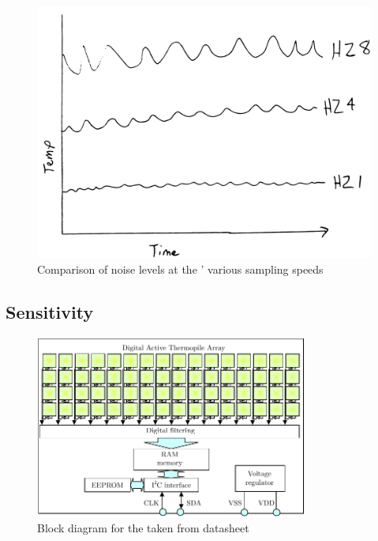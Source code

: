 \documentclass[../thesis/thesis.tex]{subfiles}
\begin{document}
\begin{figure}
\centering
\includegraphics[width=\linewidth]{../diagrams/temp/noise.pdf}
\caption{Comparison of noise levels at the \mlx' various sampling speeds}
\label{fig:noise}
\end{figure}


\subsection{Sensitivity}

\begin{figure}
\centering
\includegraphics[width=0.8\textwidth]{../diagrams/mlx-block-diagram.pdf}
\caption{Block diagram for the \mlx taken from datasheet \cite{MLXDatasheet}}
\label{fig:exps:blockdia}
\end{figure}
\end{document}
